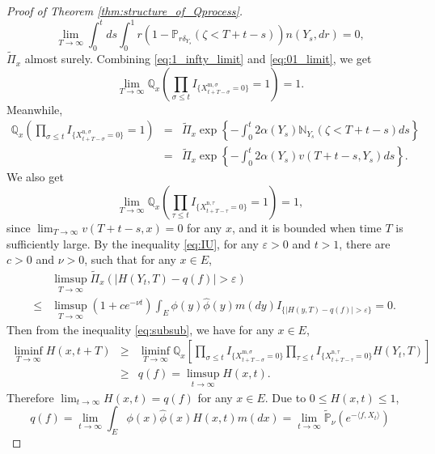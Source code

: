 \documentclass[12pt,a4paper]{amsart}
\numberwithin{equation}{section}
\theoremstyle{plain}
\theoremstyle{definition}
\begin{document}
{\begin{proof}[Proof of Theorem \ref{thm:structure_of_Qprocess}]
\begin{equation}
    \lim_{T\rightarrow\infty}\int_0^tds\int_0^1 r(1-\mathbb P_{r\delta_{Y_s}}(\zeta<T+t-s))n(Y_s,dr)=0,
  \end{equation}
  $\widetilde\Pi_x$ almost surely.  Combining \eqref{eq:1_infty_limit} and \eqref{eq:01_limit}, we get
  \[
    \lim_{T\rightarrow\infty}\mathbb Q_{x}\left(\prod_{\sigma\leq t}I_{\{ X_{t+T-\sigma}^{{\mathrm m},\sigma}=0\}}=1\right)=1.
  \]
  Meanwhile,
  \begin{eqnarray*}
    \mathbb Q_x\left(\prod_{\sigma\leq t}I_{\{ X_{t+T-\sigma}^{{\mathrm n},\sigma}=0\}}=1\right)
    &=&\widetilde\Pi_x\exp\left\{-\int_0^t2\alpha(Y_s)\mathbb N_{Y_s}(\zeta<T+t-s)ds\right\}\\
    &=&\widetilde\Pi_x\exp\left\{-\int_0^t2\alpha(Y_s)v(T+t-s,Y_s)ds\right\}.
  \end{eqnarray*}
  We also get
  \[
    \lim_{T\rightarrow\infty}\mathbb Q_x\left(\prod_{\tau\leq t}I_{\{ X_{t+T-\tau}^{{\mathrm n},\tau}=0\}}=1\right)=1,
  \]
  since $\lim_{T\rightarrow\infty} v(T+t-s,x)=0$ for any $x$, and it is bounded when time $T$ is sufficiently large.  By the inequality \eqref{eq:IU}, for any $\varepsilon>0$ and $t>1$, there are $c>0$ and $\nu>0$, such that for any $x\in E$,
  \begin{eqnarray*}
    &&\limsup_{T\rightarrow\infty}\widetilde\Pi_x\left(|H(Y_t, T)-q(f)|>\varepsilon\right)\\
    &\leq& \limsup_{T\rightarrow\infty}(1+ce^{-\nu t})\int_E\phi(y)\widehat\phi(y)m(dy)I_{\{|H(y, T)-q(f)|>\varepsilon\}}=0.
  \end{eqnarray*}
  Then from the inequality \eqref{eq:subsub}, we have for any $x\in E$,
  \begin{eqnarray*}
    \liminf_{T\rightarrow\infty}H(x, t+T)&\geq&  \liminf_{T\rightarrow\infty} \mathbb Q_x\left[\prod_{\sigma\leq t}I_{\{ X_{t+T-\sigma}^{{\mathrm m},\sigma}=0\}}\prod_{\tau\leq t}I_{\{ X_{t+T-\tau}^{{\mathrm n},\tau}=0\}}H(Y_t, T)\right]\\
                                         &\geq& q(f)=\limsup_{t\rightarrow\infty}H(x, t).
  \end{eqnarray*}
  Therefore  $\lim_{t\rightarrow\infty}H(x, t)=q(f)$ for any $x\in E$.
  Due to $0\leq H(x,t)\leq 1$,
  \begin{equation*}
    q(f)=\lim_{t\rightarrow\infty}\int_E\phi(x)\widehat\phi(x)H(x,t)m(dx)
    =\lim_{t\rightarrow\infty}\widetilde{\mathbb P}_{\nu}\left(e^{-\langle f, X_t\rangle }\right)

\end{equation*}
\end{proof}}
\end{document}
